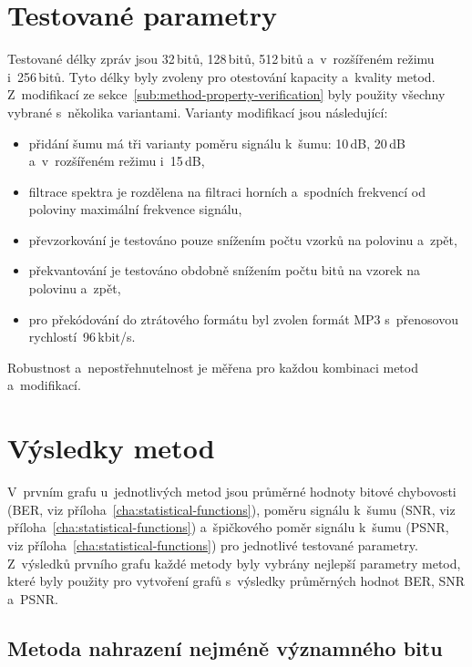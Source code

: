 \section{Testované parametry}
\label{sec:tested-parameters}

Testované délky zpráv jsou 32\,bitů, 128\,bitů, 512\,bitů a~v~rozšířeném režimu
i~256\,bitů. Tyto délky byly zvoleny pro otestování kapacity a~kvality metod.
Z~modifikací ze sekce~\ref{sub:method-property-verification} byly použity
všechny vybrané s~několika variantami. Varianty modifikací jsou následující:

\begin{itemize}
    \item přidání šumu má tři varianty poměru signálu k~šumu: 10\,dB, 20\,dB
        a~v~rozšířeném režimu i~15\,dB,
    \item filtrace spektra je rozdělena na filtraci horních a~spodních
        frekvencí od poloviny maximální frekvence signálu,
    \item převzorkování je testováno pouze snížením počtu vzorků na polovinu
        a~zpět,
    \item překvantování je testováno obdobně snížením počtu bitů na vzorek na
        polovinu a~zpět,
    \item pro překódování do ztrátového formátu byl zvolen formát MP3
        s~přenosovou rychlostí~96\,kbit/s.
\end{itemize}

\noindent Robustnost a~nepostřehnutelnost je měřena pro každou kombinaci metod
a~modifikací.

\section{Výsledky metod}
\label{sec:evaluation-results}

V~prvním grafu u~jednotlivých metod jsou průměrné hodnoty bitové chybovosti
(BER, viz příloha~\ref{cha:statistical-functions}), poměru signálu k~šumu (SNR,
viz příloha~\ref{cha:statistical-functions}) a~špičkového poměr signálu k~šumu
(PSNR, viz příloha~\ref{cha:statistical-functions}) pro jednotlivé testované
parametry. Z~výsledků prvního grafu každé metody byly vybrány nejlepší
parametry metod, které byly použity pro vytvoření grafů s~výsledky průměrných
hodnot BER, SNR a~PSNR.

\subsection*{Metoda nahrazení nejméně významného bitu}

